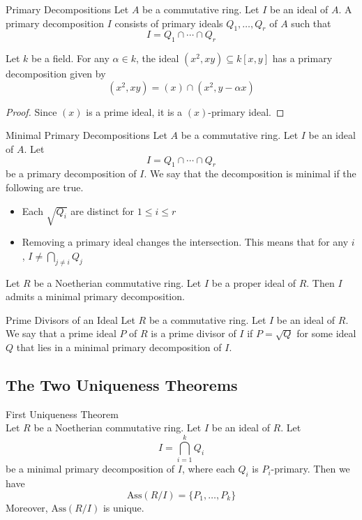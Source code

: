 \documentclass[a4paper]{article}
\begin{document}
\begin{defn}{Primary Decompositions}{} Let $A$ be a commutative ring. Let $I$ be an ideal of $A$. A primary decomposition $I$ consists of primary ideals $Q_1,\dots,Q_r$ of $A$ such that $$I=Q_1\cap\cdots\cap Q_r$$
\end{defn}

\begin{eg}{}{} Let $k$ be a field. For any $\alpha\in k$, the ideal $(x^2,xy)\subseteq k[x,y]$ has a primary decomposition given by $$(x^2,xy)=(x)\cap(x^2,y-\alpha x)$$ 
\begin{proof}
Since $(x)$ is a prime ideal, it is a $(x)$-primary ideal. 
\end{proof}
\end{eg}

\begin{defn}{Minimal Primary Decompositions}{} Let $A$ be a commutative ring. Let $I$ be an ideal of $A$. Let $$I=Q_1\cap\cdots\cap Q_r$$ be a primary decomposition of $I$. We say that the decomposition is minimal if the following are true. 
\begin{itemize}
\item Each $\sqrt{Q_i}$ are distinct for $1\leq i\leq r$
\item Removing a primary ideal changes the intersection. This means that for any $i$, $I\neq\bigcap_{j\neq i}Q_j$
\end{itemize}
\end{defn}

\begin{thm}{}{} Let $R$ be a Noetherian commutative ring. Let $I$ be a proper ideal of $R$. Then $I$ admits a minimal primary decomposition. 
\end{thm}

\begin{defn}{Prime Divisors of an Ideal}{} Let $R$ be a commutative ring. Let $I$ be an ideal of $R$. We say that a prime ideal $P$ of $R$ is a prime divisor of $I$ if $P=\sqrt{Q}$ for some ideal $Q$ that lies in a minimal primary decomposition of $I$. 
\end{defn}

\subsection{The Two Uniqueness Theorems}
\begin{thm}{First Uniqueness Theorem}{}\\
Let $R$ be a Noetherian commutative ring. Let $I$ be an ideal of $R$. Let $$I=\bigcap_{i=1}^kQ_i$$ be a minimal primary decomposition of $I$, where each $Q_i$ is $P_i$-primary. Then we have $$\text{Ass}(R/I)=\{P_1,\dots,P_k\}$$ Moreover, $\text{Ass}(R/I)$ is unique. 
\end{thm}
\end{document}
